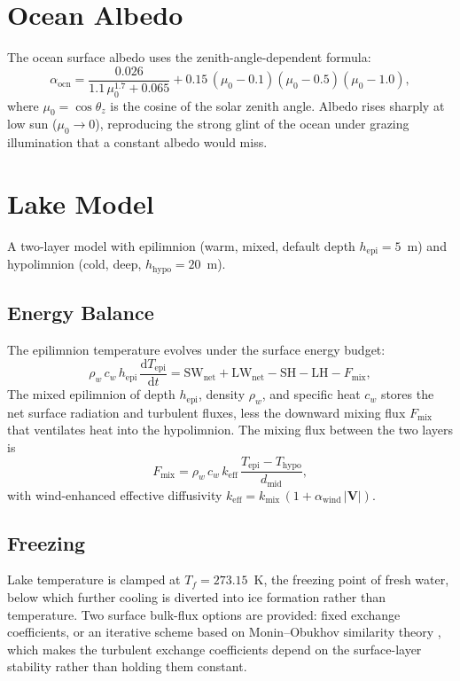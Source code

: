 \documentclass[11pt,twoside]{report}
\newcommand{\dd}{\mathrm{d}}
\newcommand{\vect}[1]{\bm{#1}}
\begin{document}
\section{Ocean Albedo}

The ocean surface albedo uses the \citet{Briegleb1986} zenith-angle-dependent
formula:
\begin{equation}
  \alpha_{\mathrm{ocn}} = \frac{0.026}{1.1\,\mu_0^{1.7}+0.065}
  + 0.15\,(\mu_0-0.1)(\mu_0-0.5)(\mu_0-1.0),
\end{equation}
where $\mu_0=\cos\theta_z$ is the cosine of the solar zenith angle.  Albedo rises
sharply at low sun ($\mu_0\to0$), reproducing the strong glint of the ocean
under grazing illumination that a constant albedo would miss.

\section{Lake Model}

A two-layer model with epilimnion (warm, mixed, default depth $h_{\mathrm{epi}}=5$~m)
and hypolimnion (cold, deep, $h_{\mathrm{hypo}}=20$~m).

\subsection{Energy Balance}
The epilimnion temperature evolves under the surface energy budget:
\begin{equation}
  \rho_w\,c_w\,h_{\mathrm{epi}}\,\frac{\dd T_{\mathrm{epi}}}{\dd t}
  = \mathrm{SW}_{\mathrm{net}} + \mathrm{LW}_{\mathrm{net}} - \mathrm{SH} - \mathrm{LH} - F_{\mathrm{mix}},
\end{equation}
The mixed epilimnion of depth $h_{\mathrm{epi}}$, density $\rho_w$, and specific
heat $c_w$ stores the net surface radiation and turbulent fluxes, less the
downward mixing flux $F_{\mathrm{mix}}$ that ventilates heat into the
hypolimnion.  The mixing flux between the two layers is
\begin{equation}
  F_{\mathrm{mix}} = \rho_w\,c_w\,k_{\mathrm{eff}}\,\frac{T_{\mathrm{epi}}-T_{\mathrm{hypo}}}{d_{\mathrm{mid}}},
\end{equation}
with wind-enhanced effective diffusivity
$k_{\mathrm{eff}} = k_{\mathrm{mix}}\,(1+\alpha_{\mathrm{wind}}\,|\vect{V}|)$.

\subsection{Freezing}
Lake temperature is clamped at $T_f = 273.15$~K, the freezing point of fresh
water, below which further cooling is diverted into ice formation rather than
temperature.  Two surface bulk-flux options are provided: fixed exchange
coefficients, or an iterative scheme based on Monin--Obukhov similarity theory
\citep{MoninObukhov1954}, which makes the turbulent exchange coefficients depend
on the surface-layer stability rather than holding them constant.
\end{document}
